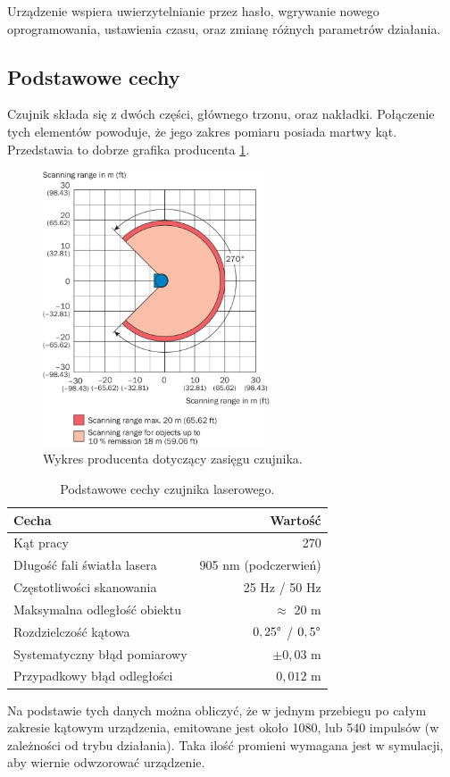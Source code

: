 		Urządzenie wspiera uwierzytelnianie przez hasło, wgrywanie nowego oprogramowania,
		ustawienia czasu, oraz zmianę różnych parametrów działania.

	\subsection{Podstawowe cechy}
		Czujnik składa się z dwóch części, głównego trzonu, oraz nakładki.
		Połączenie tych elementów powoduje, że jego zakres pomiaru posiada martwy kąt.
		Przedstawia to dobrze grafika producenta \ref{fig:lidar}.
		\begin{figure}[H]
		\centering
		\includegraphics[width=0.6\textwidth]{graphics/sick.png}
		\caption{Wykres producenta dotyczący zasięgu czujnika.}
		\label{fig:lidar}
		\end{figure} 
		
		\begin{table}
		\centering
		\begin{tabular}{l r}
		Cecha & Wartość \\
		\hline
		Kąt pracy & 270\textdegree \\
		Długość fali światła lasera & 905 nm (podczerwień) \\
		Częstotliwości skanowania & 25 Hz / 50 Hz \\
		Maksymalna odległość obiektu & $\approx$ 20 m \\
		Rozdzielczość kątowa & $0,25 \degree$ / $0,5 \degree $ \\
		Systematyczny błąd pomiarowy & $\pm 0,03$ m \\
		Przypadkowy błąd odległości & $0,012$ m \\
		\end{tabular}
		\caption{Podstawowe cechy czujnika laserowego.}
		\label{tab:lidar}
		\end{table}
		Na podstawie tych danych można obliczyć, że w jednym przebiegu po całym zakresie kątowym urządzenia, 
		emitowane jest około 1080, lub 540 impulsów (w zależności od trybu działania).
		Taka ilość promieni wymagana jest w symulacji, aby wiernie odwzorować urządzenie.

